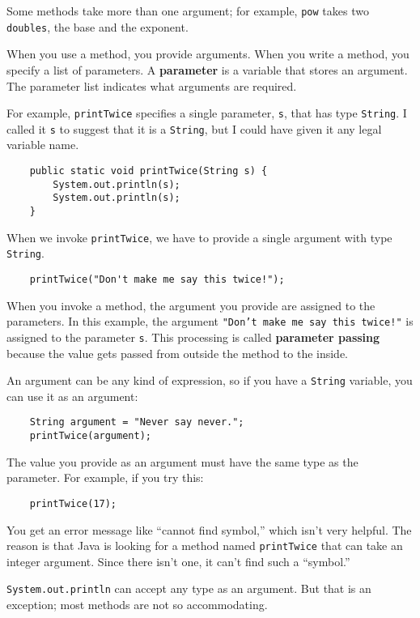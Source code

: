\documentclass[12pt]{book}
\theoremstyle{definition}
\begin{document}
Some methods take more than one argument; for example, {\tt pow}
takes two {\tt doubles}, the base and the exponent.

When you use a method, you provide arguments.  When you write
a method, you specify a list of parameters.  A {\bf parameter}
is a variable that stores an argument.  The parameter list
indicates what arguments are required.

For example, {\tt printTwice} specifies a single parameter,
{\tt s}, that has type {\tt String}.  I called it {\tt s} to
suggest that it is a {\tt String}, but I could have given it 
any legal variable name.

\begin{lstlisting}
    public static void printTwice(String s) {
        System.out.println(s);
        System.out.println(s);
    }
\end{lstlisting}
%
When we invoke {\tt printTwice}, we have to provide
a single argument with type {\tt String}.

\begin{lstlisting}
    printTwice("Don't make me say this twice!");
\end{lstlisting}

When you invoke a method, the argument you provide are assigned to the
parameters.  In this example, the argument {\tt "Don't make me say this
  twice!"} is assigned to the parameter {\tt s}.  This processing
is called {\bf parameter passing} because the value gets passed
from outside the method to the inside.

An argument can be any kind of expression, so if you
have a {\tt String} variable, you can use it as an argument:

\begin{lstlisting}
    String argument = "Never say never.";
    printTwice(argument);
\end{lstlisting}
%
The value you provide as an argument must have the same type as
the parameter.  For example, if you try this:

\begin{lstlisting}
    printTwice(17);
\end{lstlisting}
%
You get an error message like ``cannot find symbol,'' which isn't very
helpful.  The reason is that Java is looking for a method named
{\tt printTwice} that can take an integer argument.  Since there
isn't one, it can't find such a ``symbol.''

{\tt System.out.println} can accept any
type as an argument.  But that is an exception; most methods
are not so accommodating.
\end{document}
